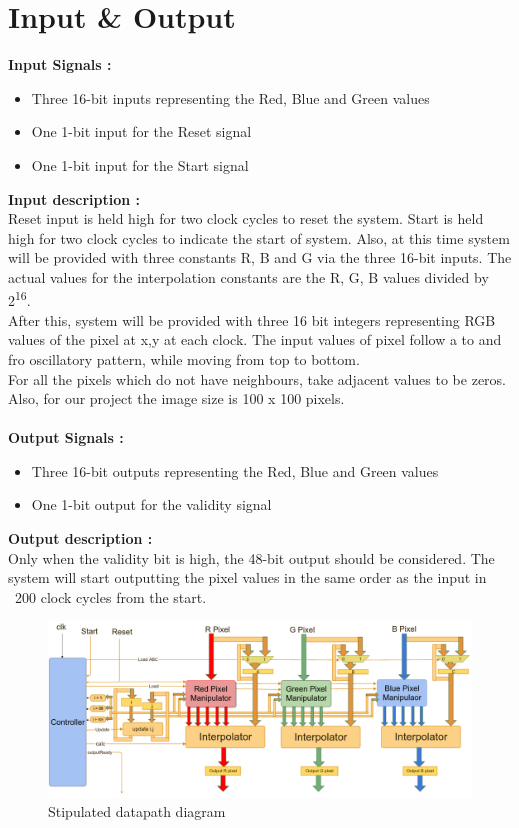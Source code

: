 \documentclass[a4paper,12pt]{article}
\begin{document}
\section{Input \& Output}
\textbf{Input Signals :}
\vspace{-0.04cm}
\begin{itemize}
  	\setlength{\itemsep}{-0.1cm}
  	\item Three 16-bit inputs representing the Red, Blue and Green values
  	\item One 1-bit input for the Reset signal
  	\item One 1-bit input for the Start signal
\end{itemize}
\textbf{Input description :}\\
Reset input is held high for two clock cycles to reset the system. Start is held high for two clock cycles to indicate the start of system. Also, at this time system will be provided with three constants R, B and G via the three 16-bit inputs. The actual values for the interpolation constants are the R, G, B values divided by 2\textsuperscript{16}.\\
After this, system will be provided with three 16 bit integers representing RGB values of the pixel at x,y at each clock. The input values of pixel follow a to and fro oscillatory pattern, while moving from top to bottom.\\
For all the pixels which do not have neighbours, take adjacent values to be zeros. Also, for our project the image size is 100 x 100 pixels.
\\\\
\textbf{Output Signals :}
\vspace{-0.04cm}
\begin{itemize}
  	\setlength{\itemsep}{-0.1cm}
  	\item Three 16-bit outputs representing the Red, Blue and Green values
  	\item One 1-bit output for the validity signal
\end{itemize}
\textbf{Output description :}\\
Only when the validity bit is high, the 48-bit output should be considered. The system will start outputting the pixel values in the same order as the input in ~200 clock cycles from the start.

\clearpage

\begin{landscape}
\vspace{5cm}
\begin{figure}
	\includegraphics[scale = 0.45]{datapath.png}
	\caption{Stipulated datapath diagram}
\end{figure}
\end{landscape}
\end{document}
